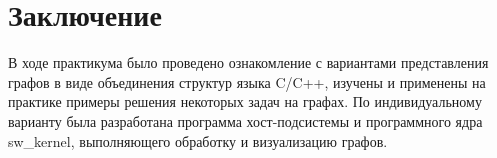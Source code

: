 \chapter*{Заключение}

В ходе практикума было проведено ознакомление с вариантами представления
графов в виде объединения структур языка C/C++, изучены и применены на
практике примеры решения некоторых задач на графах. По индивидуальному
варианту была разработана программа хост-подсистемы и программного ядра
sw\_kernel, выполняющего обработку и визуализацию графов.
